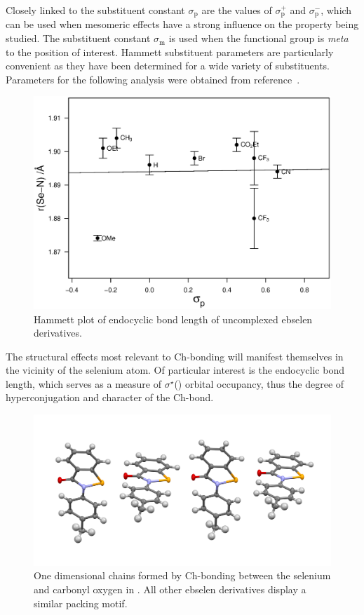 \begin{refsection}
Closely linked to the substituent constant $ \sigma_\text{p} $ are the values of $\sigma_\text{p}^{+}$ and $\sigma_\text{p}^{-}$, which can be used when mesomeric effects have a strong influence on the property being studied.
The substituent constant $ \sigma_\text{m} $ is used when the functional group is \textit{meta} to the position of interest.
Hammett substituent parameters are particularly convenient as they have been determined for a wide variety of substituents.
Parameters for the following analysis were obtained from reference~\cite{Hansch1991}.

\begin{figure}
    \centering
    \includegraphics[width=0.9\linewidth]{Figures/hammett-endo-free.eps}
    \caption{Hammett plot of endocyclic  bond length of uncomplexed ebselen derivatives.}\label{fig:hammett-endo-free}
\end{figure}

The structural effects most relevant to Ch-bonding will manifest themselves in the vicinity of the selenium atom.
Of particular interest is the endocyclic  bond length, which serves as a measure of $\sigma^\star$() orbital occupancy, thus the degree of hyperconjugation and character of the Ch-bond.

\begin{figure}
  \centering
  \includegraphics[width=0.6\linewidth]{Figures/ebs.me-packing.pdf}
  \caption[One dimensional chains formed by Ch-bonding between the selenium and carbonyl oxygen in .]{One dimensional chains formed by Ch-bonding between the selenium and carbonyl oxygen in . All other ebselen derivatives display a similar packing motif.}\label{fig:ebs-me-packing}
\end{figure}


\end{refsection}
